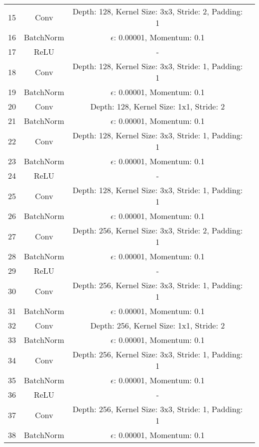 \documentclass[10pt,twocolumn,letterpaper]{article}
\begin{document}
\begin{table}[ht]
\begin{tabular}{|l|c|c|r}
        
        \multirow{1}{0.5cm}{15} & Conv & Depth: 128, Kernel Size: 3x3, Stride: 2, Padding: 1\\
        \multirow{1}{0.5cm}{16} & BatchNorm & $\epsilon$: 0.00001, Momentum: 0.1\\
        \multirow{1}{0.5cm}{17} & ReLU & -\\
        \multirow{1}{0.5cm}{18} & Conv & Depth: 128, Kernel Size: 3x3, Stride: 1, Padding: 1\\
        \multirow{1}{0.5cm}{19} & BatchNorm & $\epsilon$: 0.00001, Momentum: 0.1\\
        \multirow{1}{0.5cm}{20} & Conv & Depth: 128, Kernel Size: 1x1, Stride: 2\\
        \multirow{1}{0.5cm}{21} & BatchNorm & $\epsilon$: 0.00001, Momentum: 0.1\\
        \multirow{1}{0.5cm}{22} & Conv & Depth: 128, Kernel Size: 3x3, Stride: 1, Padding: 1\\
        \multirow{1}{0.5cm}{23} & BatchNorm & $\epsilon$: 0.00001, Momentum: 0.1\\
        \multirow{1}{0.5cm}{24} & ReLU & -\\
        \multirow{1}{0.5cm}{25} & Conv & Depth: 128, Kernel Size: 3x3, Stride: 1, Padding: 1\\
        \multirow{1}{0.5cm}{26} & BatchNorm & $\epsilon$: 0.00001, Momentum: 0.1\\
        
        
        \multirow{1}{0.5cm}{27} & Conv & Depth: 256, Kernel Size: 3x3, Stride: 2, Padding: 1\\
        \multirow{1}{0.5cm}{28} & BatchNorm & $\epsilon$: 0.00001, Momentum: 0.1\\
        \multirow{1}{0.5cm}{29} & ReLU & -\\
        \multirow{1}{0.5cm}{30} & Conv & Depth: 256, Kernel Size: 3x3, Stride: 1, Padding: 1\\
        \multirow{1}{0.5cm}{31} & BatchNorm & $\epsilon$: 0.00001, Momentum: 0.1\\
        \multirow{1}{0.5cm}{32} & Conv & Depth: 256, Kernel Size: 1x1, Stride: 2\\
        \multirow{1}{0.5cm}{33} & BatchNorm & $\epsilon$: 0.00001, Momentum: 0.1\\
        \multirow{1}{0.5cm}{34} & Conv & Depth: 256, Kernel Size: 3x3, Stride: 1, Padding: 1\\
        \multirow{1}{0.5cm}{35} & BatchNorm & $\epsilon$: 0.00001, Momentum: 0.1\\
        \multirow{1}{0.5cm}{36} & ReLU & -\\
        \multirow{1}{0.5cm}{37} & Conv & Depth: 256, Kernel Size: 3x3, Stride: 1, Padding: 1\\
        \multirow{1}{0.5cm}{38} & BatchNorm & $\epsilon$: 0.00001, Momentum: 0.1\\
        

\end{tabular}
\end{table}
\end{document}

